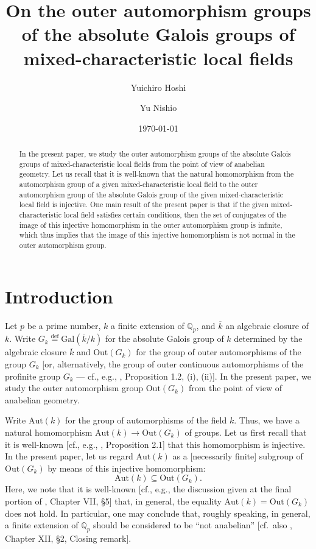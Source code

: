 \documentclass[11pt,showkeys]{article}
\title{On the outer automorphism groups of the absolute Galois groups of mixed-characteristic local fields}
\author{Yuichiro Hoshi \and Yu Nishio}
\date{\today}
\theoremstyle{theorem}
\theoremstyle{definition}
\begin{document}
\maketitle

\begin{abstract}
In the present paper, we study the outer automorphism groups of the 
absolute Galois groups of mixed-characteristic local fields from the 
point of view of anabelian geometry.  Let us recall that it is 
well-known that the natural homomorphism from the automorphism group 
of a given mixed-characteristic local field to the outer automorphism 
group of the absolute Galois group of the given mixed-characteristic 
local field is injective.  One main result of the present paper is 
that if the given mixed-characteristic local field satisfies certain 
conditions, then the set of conjugates of the image of this injective 
homomorphism in the outer automorphism group is infinite, which thus 
implies that the image of this injective homomorphism is not normal in 
the outer automorphism group. 
\end{abstract} 


\begin{comment}
\keywords{mixed-characteristic local field, Galois group, 
anabelian geometry, mono-anabelian geometry, 
group of MLF-type}
\subjclass{hoge}
\end{comment}

\setcounter{section}{-1}

\section*{Introduction}
Let $p$ be a prime number, $k$ a finite extension of 
$\mathbb{Q}_p$, and $\overline{k}$ an algebraic closure 
of $k$.  Write $G_k \stackrel{\mathrm{def}}{=} \mathrm{Gal}
(\overline{k} / k)$ for the absolute Galois group of $k$ 
determined by the algebraic closure $\overline{k}$ 
and $\mathrm{Out}(G_k)$ for the group of outer 
automorphisms of the group $G_k$ [or, alternatively, the 
group of outer continuous automorphisms of the profinite 
group $G_k$ --- cf., e.g., \cite{Hoshi4}, Proposition 1.2, 
(i), (ii)].  In the present paper, we study the outer automorphism group 
$\mathrm{Out}(G_k)$ from the point of view of anabelian 
geometry.  


Write $\mathrm{Aut}(k)$ for the group of automorphisms of 
the field $k$.  Thus, we have a natural homomorphism 
$\mathrm{Aut}(k) \to \mathrm{Out}(G_k)$ of groups.  Let us 
first recall that it is well-known [cf., e.g., \cite{Hoshi1}, 
Proposition 2.1] that this homomorphism is injective.  In 
the present paper, let us regard $\mathrm{Aut}(k)$ as a 
[necessarily finite] subgroup of $\mathrm{Out}(G_k)$ by 
means of this injective homomorphism:  
\[
\mathrm{Aut}(k) \subseteq \mathrm{Out}(G_k).  
\]
Here, we note that it is well-known [cf., e.g., the 
discussion given at the final portion of \cite{NSW}, 
Chapter VII, \S 5] that, in general, the equality 
$\mathrm{Aut}(k) = \mathrm{Out}(G_k)$ does not hold.  
In particular, one may conclude that, roughly speaking, 
in general, a finite extension of $\mathbb{Q}_p$ 
should be considered to be ``not anabelian'' [cf.\ also \cite{NSW}, Chapter XII, \S 2, Closing remark].   
\end{document}
